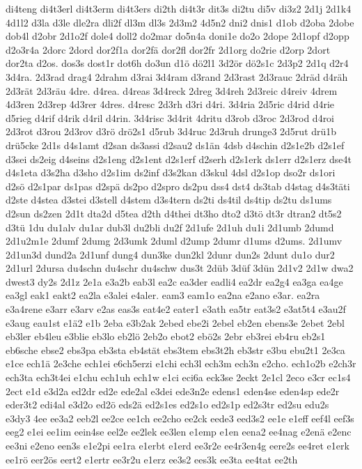{di4teng
di4t3erl
di4t3erm
di4t3ers
di2th
di4t3r
dit3s
di2tu
di5v
di3z2
2d1j
2d1k4
4d1l2
d3la
d3le
dle2ra
dli2f
dl3m
dl3s
2d3m2
4d5n2
dni2
dnis1
d1ob
d2oba
2dobe
dob4l
d2obr
2d1o2f
dole4
doll2
do2mar
do5n4a
doni1e
do2o
2dope
2d1opf
d2opp
d2o3r4a
2dorc
2dord
dor2f1a
dor2fä
dor2fl
dor2fr
2d1org
do2rie
d2orp
2dort
dor2ta
d2os.
dos3s
dost1r
dot6h
do3un
d1ö
dö2l1
3d2ör
dö2s1c
2d3p2
2d1q
d2r4
3d4ra.
2d3rad
drag4
2drahm
d3rai
3d4ram
d3rand
2d3rast
2d3rauc
2dräd
d4räh
2d3rät
2d3räu
4dre.
d4rea.
d4reas
3d4reck
2dreg
3d4reh
2d3reic
d4reiv
4drem
4d3ren
2d3rep
4d3rer
4dres.
d4resc
2d3rh
d3ri
d4ri.
3d4ria
2d5ric
d4rid
d4rie
d5rieg
d4rif
d4rik
d4ril
d4rin.
3d4risc
3d4rit
4dritu
d3rob
d3roc
2d3rod
d4roi
2d3rot
d3rou
2d3rov
d3rö
drö2s1
d5rub
3d4ruc
2d3ruh
drunge3
2d5rut
drü1b
drü5cke
2d1s
d4s1amt
d2san
ds3assi
d2sau2
ds1än
4dsb
d4schin
d2s1e2b
d2s1ef
d3sei
ds2eig
d4seins
d2s1eng
d2s1ent
d2s1erf
d2serh
d2s1erk
ds1err
d2s1erz
dse4t
d4s1eta
d3s2ha
d3sho
d2s1im
ds2inf
d3s2kan
d3skul
4dsl
d2s1op
dso2r
ds1ori
d2sö
d2s1par
ds1pas
d2spä
ds2po
d2spro
ds2pu
dss4
dst4
ds3tab
d4stag
d4s3täti
d2ste
d4stea
d3stei
d3stell
d4stem
d3s4tern
ds2ti
ds4til
ds4tip
ds2tu
ds1ums
d2sun
ds2zen
2d1t
dta2d
d5tea
d2th
d4thei
dt3ho
dto2
d3tö
dt3r
dtran2
dt5s2
d3tü
1du
du1alv
du1ar
dub3l
du2bli
du2f
2d1ufe
2d1uh
du1i
2d1umb
2dumd
2d1u2m1e
2dumf
2dumg
2d3umk
2duml
d2ump
2dumr
d1ums
d2ums.
2d1umv
2d1un3d
dund2a
2d1unf
dung4
dun3ke
dun2kl
2dunr
dun2s
2dunt
du1o
dur2
2d1url
2dursa
du4schn
du4schr
du4schw
dus3t
2düb
3düf
3dün
2d1v2
2d1w
dwa2
dwest3
dy2s
2d1z
2e1a
e3a2b
eab3l
ea2c
ea3der
eadli4
ea2dr
ea2g4
ea3ga
ea4ge
ea3gl
eak1
eakt2
ea2la
e3alei
e4aler.
eam3
eam1o
ea2na
e2ano
e3ar.
ea2ra
e3a4rene
e3arr
e3arv
e2as
eas3s
eat4e2
eater1
e3ath
ea5tr
eat3s2
e3at5t4
e3au2f
e3aug
eau1st
e1ä2
e1b
2eba
e3b2ak
2ebed
ebe2i
2ebel
eb2en
ebens3e
2ebet
2ebl
eb3ler
eb4leu
e3blie
eb3lo
eb2lö
2eb2o
ebot2
ebö2s
2ebr
eb3rei
eb4ru
eb2s1
eb6sche
ebse2
ebs3pa
eb3sta
eb4stät
ebs3tem
ebs3t2h
eb3str
e3bu
ebu2t1
2e3ca
e1ce
ech1ä
2e3che
ech1ei
e6ch5erzi
e1chi
ech3l
ech3m
ech3n
e2cho.
ech1o2b
e2ch3r
ech3ta
ech3t4ei
e1chu
ech1uh
ech1w
e1ci
eci6a
eck3se
2eckt
2e1cl
2eco
e3cr
ec1s4
2ect
e1d
e3d2a
ed2dr
ed2e
ede2al
e3dei
ede3n2e
edens1
eden4se
eden4sp
ede2r
eder3t2
edi4al
e3d2o
ed2ö
eds2ä
ed2s1es
ed2s1o
ed2s1p
ed2s3tr
ed2su
edu2s
e3dy3
4ee
ee3a2
eeb2l
ee2ce
ee1ch
ee2cho
ee2ck
eede3
eed3s2
ee1e
e1eff
eef4l
eef3s
eeg2
e1ei
ee1im
eein4se
eel2e
ee2lek
ee3len
e1emp
e1en
eena2
ee4nag
e2enä
e2enc
ee3ni
e2eno
een3s
e1e2pi
ee1ra
e1erbt
e1erd
ee3r2e
ee4r3en4g
eere2s
ee4ret
e1erk
ee1rö
eer2ös
eert2
e1ertr
ee3r2u
e1erz
ee3s2
ees3k
ee3ta
ee4tat
ee2th
}
